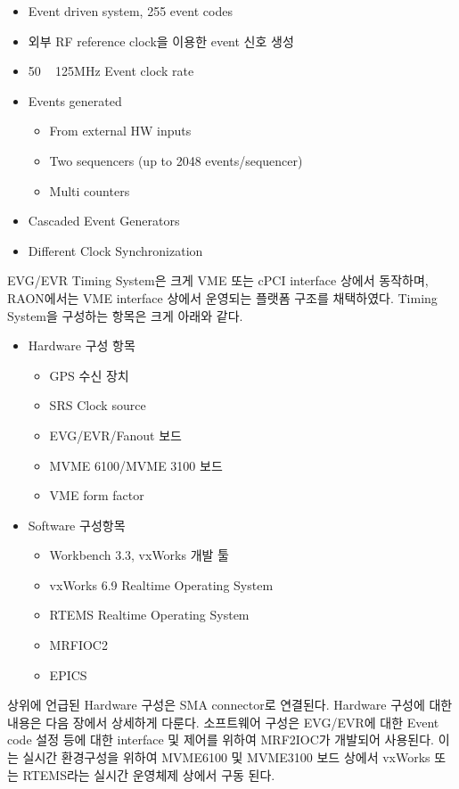 \documentclass[11pt
-  , a4paper
  , article
  , oneside
]{memoir}
\begin{document}
\begin{multicols}{2}
\begin{itemize}
	\item Event driven system, 255 event codes
	\item 외부 RF reference clock을 이용한 event 신호 생성
	\item 50 ~ 125MHz Event clock rate
	\item Events generated
	\begin{itemize}
		\item From external HW inputs
		\item Two sequencers (up to 2048 events/sequencer)
		\item Multi counters
	\end{itemize}
	\item Cascaded Event Generators
	\item Different Clock Synchronization
\end{itemize}
EVG/EVR Timing System은 크게 VME 또는 cPCI interface 상에서 동작하며, RAON에서는 VME interface 상에서 운영되는 플랫폼 구조를 채택하였다. Timing System을 구성하는 항목은 크게 아래와 같다.
\begin{itemize}
	\item Hardware 구성 항목
	\begin{itemize}
		\item GPS 수신 장치
		\item SRS Clock source
		\item EVG/EVR/Fanout 보드
		\item MVME 6100/MVME 3100 보드 
		\item VME form factor		
	\end{itemize}
	\item Software 구성항목
	\begin{itemize}
		\item Workbench 3.3, vxWorks 개발 툴
		\item vxWorks 6.9 Realtime Operating System
		\item RTEMS Realtime Operating System
		\item MRFIOC2  
		\item EPICS		
	\end{itemize}
\end{itemize}

상위에 언급된 Hardware 구성은 SMA connector로 연결된다. Hardware 구성에 대한 내용은 다음 장에서 상세하게 다룬다. 소프트웨어 구성은 EVG/EVR에 대한 Event code 설정 등에 대한 interface 및 제어를 위하여 MRF2IOC가 개발되어 사용된다. 이는 실시간 환경구성을 위하여 MVME6100 및 MVME3100 보드 상에서 vxWorks 또는 RTEMS라는 실시간 운영체제 상에서 구동 된다.




\end{multicols}
\end{document}
